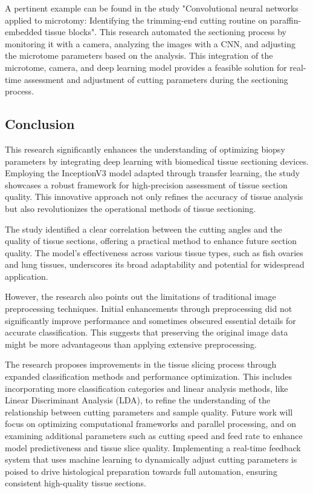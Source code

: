A pertinent example can be found in the study "Convolutional neural networks applied to microtomy: Identifying the trimming-end cutting routine on paraffin-embedded tissue blocks"\cite{6.4}. This research automated the sectioning process by monitoring it with a camera, analyzing the images with a CNN, and adjusting the microtome parameters based on the analysis. This integration of the microtome, camera, and deep learning model provides a feasible solution for real-time assessment and adjustment of cutting parameters during the sectioning process.

\subsection{Conclusion}
This research significantly enhances the understanding of optimizing biopsy parameters by integrating deep learning with biomedical tissue sectioning devices. Employing the InceptionV3 model adapted through transfer learning, the study showcases a robust framework for high-precision assessment of tissue section quality. This innovative approach not only refines the accuracy of tissue analysis but also revolutionizes the operational methods of tissue sectioning.

The study identified a clear correlation between the cutting angles and the quality of tissue sections, offering a practical method to enhance future section quality. The model’s effectiveness across various tissue types, such as fish ovaries and lung tissues, underscores its broad adaptability and potential for widespread application.

However, the research also points out the limitations of traditional image preprocessing techniques. Initial enhancements through preprocessing did not significantly improve performance and sometimes obscured essential details for accurate classification. This suggests that preserving the original image data might be more advantageous than applying extensive preprocessing.

The research proposes improvements in the tissue slicing process through expanded classification methods and performance optimization. This includes incorporating more classification categories and linear analysis methods, like Linear Discriminant Analysis (LDA), to refine the understanding of the relationship between cutting parameters and sample quality. Future work will focus on optimizing computational frameworks and parallel processing, and on examining additional parameters such as cutting speed and feed rate to enhance model predictiveness and tissue slice quality. Implementing a real-time feedback system that uses machine learning to dynamically adjust cutting parameters is poised to drive histological preparation towards full automation, ensuring consistent high-quality tissue sections.

